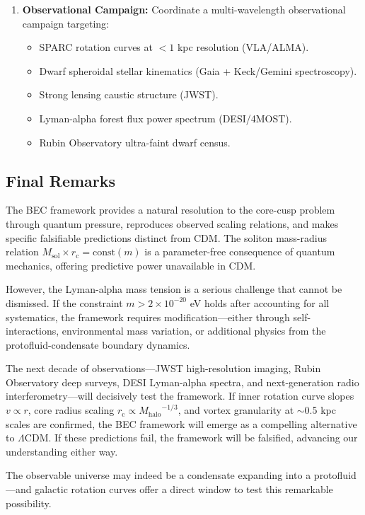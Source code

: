 \documentclass[11pt,a4paper]{article}
\newcommand{\Msol}{\ensuremath{M_{\mathrm{sol}}}}
\newcommand{\Mhalo}{\ensuremath{M_{\mathrm{halo}}}}
\newcommand{\rc}{\ensuremath{r_{\mathrm{c}}}}
\theoremstyle{definition}
\theoremstyle{remark}
\begin{document}
\begin{enumerate}[leftmargin=*, itemsep=0.3em]
\item \textbf{Observational Campaign:} Coordinate a multi-wavelength observational campaign targeting:
\begin{itemize}[leftmargin=*]
\item SPARC rotation curves at $<1$ kpc resolution (VLA/ALMA).
\item Dwarf spheroidal stellar kinematics (Gaia + Keck/Gemini spectroscopy).
\item Strong lensing caustic structure (JWST).
\item Lyman-alpha forest flux power spectrum (DESI/4MOST).
\item Rubin Observatory ultra-faint dwarf census.
\end{itemize}
\end{enumerate}

\subsection{Final Remarks}
\label{sec:final_remarks}

The BEC framework provides a natural resolution to the core-cusp problem through quantum pressure, reproduces observed scaling relations, and makes specific falsifiable predictions distinct from CDM. The soliton mass-radius relation $\Msol \times \rc = \text{const}(m)$ is a parameter-free consequence of quantum mechanics, offering predictive power unavailable in CDM.

However, the Lyman-alpha mass tension is a serious challenge that cannot be dismissed. If the constraint $m > 2 \times 10^{-20}$ eV holds after accounting for all systematics, the framework requires modification---either through self-interactions, environmental mass variation, or additional physics from the protofluid-condensate boundary dynamics.

The next decade of observations---JWST high-resolution imaging, Rubin Observatory deep surveys, DESI Lyman-alpha spectra, and next-generation radio interferometry---will decisively test the framework. If inner rotation curve slopes $v \propto r$, core radius scaling $\rc \propto \Mhalo^{-1/3}$, and vortex granularity at $\sim$0.5 kpc scales are confirmed, the BEC framework will emerge as a compelling alternative to $\Lambda$CDM. If these predictions fail, the framework will be falsified, advancing our understanding either way.

The observable universe may indeed be a condensate expanding into a protofluid---and galactic rotation curves offer a direct window to test this remarkable possibility.
\end{document}
